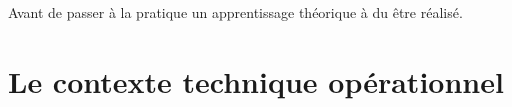 


Avant de passer à la pratique un apprentissage théorique à du être réalisé.

\section{Le contexte technique opérationnel}

